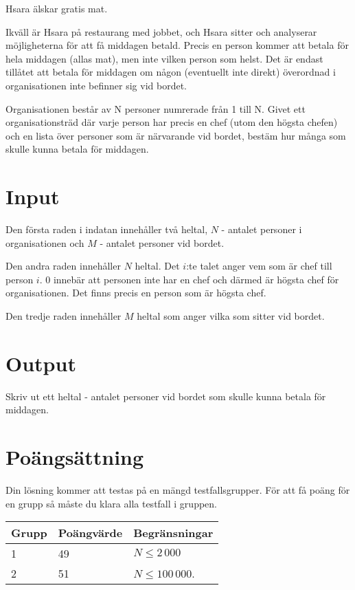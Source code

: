 
Hsara älskar gratis mat.

Ikväll är Hsara på restaurang med jobbet, och Hsara sitter och analyserar möjligheterna för att få middagen betald. Precis en person kommer att betala för hela middagen (allas mat), men inte vilken person som helst. Det är endast tillåtet att betala för middagen om någon (eventuellt inte direkt) överordnad i organisationen inte befinner sig vid bordet.

Organisationen består av N personer numrerade från 1 till N. Givet ett organisationsträd där varje person har precis en chef (utom den högsta chefen) och en lista över personer som är närvarande vid bordet, bestäm hur många som skulle kunna betala för middagen.

\section*{Input}

Den första raden i indatan innehåller två heltal, $N$ - antalet personer i organisationen och $M$ - antalet personer vid bordet.

Den andra raden innehåller $N$ heltal. Det $i$:te talet anger vem som är chef till person $i$. 0 innebär att personen inte har en chef och därmed är högsta chef för organisationen. Det finns precis en person som är högsta chef.

Den tredje raden innehåller $M$ heltal som anger vilka som sitter vid bordet.

\section*{Output}

Skriv ut ett heltal - antalet personer vid bordet som skulle kunna betala för middagen.

\section*{Poängsättning}
Din lösning kommer att testas på en mängd testfallsgrupper. För att få poäng för en grupp så måste du klara alla testfall i gruppen.

\begin{tabular}{| l | l | l |}
	\hline
	Grupp & Poängvärde & Begränsningar\\ \hline
  1     & 49         & $N \le 2\,000$ \\ \hline
  2     & 51         & $N \le 100\,000$. \\ \hline
\end{tabular}
